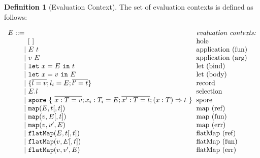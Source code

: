 \documentclass{article}
\theoremstyle{definition}
\newtheorem{defn}{Definition}[section]
\newcommand{\gap}{\quad\quad}
\newcommand{\ba}{\begin{array}}
\newcommand{\ea}{\end{array}}
\newcommand{\seq}[1]{\overline{#1}}
\begin{document}
\begin{defn}[Evaluation Context]
  The set of evaluation contexts is defined as follows:
  
 $\ba[t]{l@{\hspace{2mm}}l}
E ::=                                                                                                     & \mbox{\it{evaluation contexts:}} \\
\gap \:\:\:\: [~]                                                                                         & \mbox{hole} \\
\gap ~|~  E~t                                                                                             & \mbox{application (fun)} \\
\gap ~|~  v~E                                                                                             & \mbox{application (arg)} \\
\gap ~|~  \texttt{let}~x = E~\texttt{in}~t                                                                & \mbox{let (bind)} \\
\gap ~|~  \texttt{let}~x = v~\texttt{in}~E                                                                & \mbox{let (body)} \\
\gap ~|~  \{ \seq{l = v} ; l_i = E ; \seq{l' = t} \}                                                      & \mbox{record} \\
\gap ~|~  E.l                                                                                             & \mbox{selection} \\
\gap ~|~  \texttt{spore}~\{~\seq{x : T = v} ; x_i : T_i = E ; \seq{x' : T = t} ; (x: T) \Rightarrow t~\}  & \mbox{spore} \\
\gap ~|~  \texttt{map}(E, t[, t])                                                                         & \mbox{map (ref)} \\
\gap ~|~  \texttt{map}(v, E[, t])                                                                         & \mbox{map (fun)} \\
\gap ~|~  \texttt{map}(v, v', E)                                                                          & \mbox{map (err)} \\
\gap ~|~  \texttt{flatMap}(E, t[, t])                                                                     & \mbox{flatMap (ref)} \\
\gap ~|~  \texttt{flatMap}(v, E[, t])                                                                     & \mbox{flatMap (fun)} \\
\gap ~|~  \texttt{flatMap}(v, v', E)                                                                      & \mbox{flatMap (err)} \\
\ea$ 
\end{defn}
\end{document}
